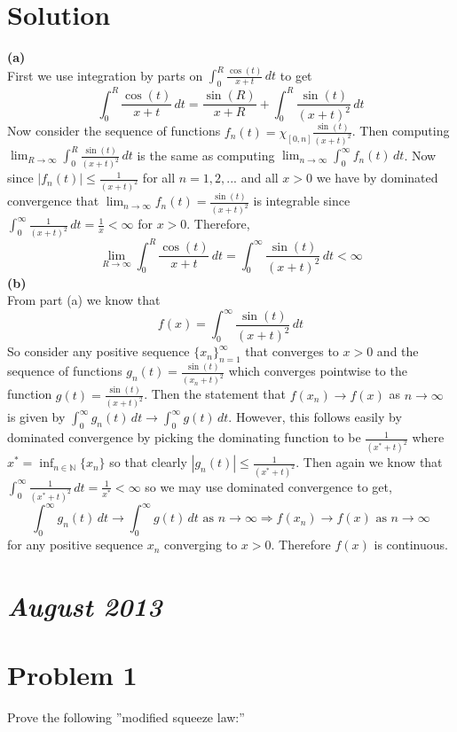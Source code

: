 \documentclass{article}
\newcommand{\field}[1]{\mathbb{#1}}
\begin{document}
\section*{Solution}
\textbf{(a)}\\
First we use integration by parts on $\int_0^R\frac{\cos(t)}{x+t}\,dt$ to get
$$\int_0^R\frac{\cos(t)}{x+t}\,dt=\frac{\sin(R)}{x+R}+\int_0^R\frac{\sin(t)}{(x+t)^2}\,dt$$
Now consider the sequence of functions $f_n(t)=\chi_{[0,n]}\frac{\sin(t)}{(x+t)^2}$. Then computing $\lim_{R\to\infty}\int_0^R\frac{\sin(t)}{(x+t)^2}\,dt$ is the same as computing $\lim_{n\to\infty}\int_0^\infty f_n(t)\,dt$. Now since $|f_n(t)|\leq\frac{1}{(x+t)^2}$ for all $n=1,2,...$ and all $x>0$ we have by dominated convergence that $\lim_{n\to\infty} f_n(t)=\frac{\sin(t)}{(x+t)^2}$ is integrable since\\ $\int_0^\infty\frac{1}{(x+t)^2}\,dt=\frac{1}{x}<\infty$ for $x>0$. Therefore, 
$$\lim_{R\to\infty}\int_0^R\frac{\cos(t)}{x+t}\,dt=\int_0^\infty\frac{\sin(t)}{(x+t)^2}\,dt<\infty$$
\textbf{(b)}\\
From part (a) we know that
$$f(x)=\int_0^\infty\frac{\sin(t)}{(x+t)^2}\,dt$$
So consider any positive sequence $\{x_n\}_{n=1}^\infty$ that converges to $x>0$ and the sequence of functions $g_n(t)=\frac{\sin(t)}{(x_n+t)^2}$ which converges pointwise to the function $g(t)=\frac{\sin(t)}{(x+t)^2}$. Then the statement that $f(x_n)\to f(x)$ as $n\to\infty$ is given by $\int_0^\infty g_n(t)\,dt\to\int_0^\infty g(t)\,dt$. However, this follows easily by dominated convergence by picking the dominating function to be $\frac{1}{(x^{*}+t)^2}$ where $x^{*}=\inf_{n\in\field{N}}\{x_n\}$ so that clearly $|g_n(t)|\leq\frac{1}{(x^{*}+t)^2}$. Then again we know that $\int_0^\infty\frac{1}{(x^{*}+t)^2}\,dt=\frac{1}{x^{*}}<\infty$ so we may use dominated convergence to get,
$$\int_0^\infty g_n(t)\,dt\to\int_0^\infty g(t)\,dt\text{ as }n\to\infty\Rightarrow f(x_n)\to f(x)\text{ as }n\to\infty$$
for any positive sequence $x_n$ converging to $x>0$. Therefore $f(x)$ is continuous.
\section*{{\it August 2013}}

\section*{Problem 1}
Prove the following ''modified squeeze law:''\\
\end{document}
